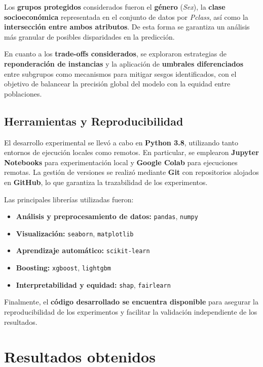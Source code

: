 \documentclass[sjournal]{IEEEtran}
\begin{document}
\vspace{0.2cm}
Los \textbf{grupos protegidos} considerados fueron el \textbf{género} (\textit{Sex}), la \textbf{clase socioeconómica} representada en el conjunto de datos por \textit{Pclass}, así como la \textbf{intersección entre ambos atributos}. De esta forma se garantiza un análisis más granular de posibles disparidades en la predicción.
\vspace{0.2cm}

En cuanto a los \textbf{trade-offs considerados}, se exploraron estrategias de \textbf{reponderación de instancias} y la aplicación de \textbf{umbrales diferenciados} entre subgrupos como mecanismos para mitigar sesgos identificados, con el objetivo de balancear la precisión global del modelo con la equidad entre poblaciones.


\subsection*{Herramientas y Reproducibilidad}
El desarrollo experimental se llevó a cabo en \textbf{Python 3.8}, utilizando tanto entornos de ejecución locales como remotos. En particular, se emplearon \textbf{Jupyter Notebooks} para experimentación local y \textbf{Google Colab} para ejecuciones remotas. La gestión de versiones se realizó mediante \textbf{Git} con repositorios alojados en \textbf{GitHub}, lo que garantiza la trazabilidad de los experimentos.

Las principales librerías utilizadas fueron:

\begin{itemize}
    \item \textbf{Análisis y preprocesamiento de datos:} \verb|pandas|, \verb|numpy|
    \item \textbf{Visualización:} \verb|seaborn|, \verb|matplotlib|
    \item \textbf{Aprendizaje automático:} \verb|scikit-learn|
    \item \textbf{Boosting:} \verb|xgboost|, \verb|lightgbm|
    \item \textbf{Interpretabilidad y equidad:} \verb|shap|, \verb|fairlearn|
\end{itemize}
Finalmente, el \textbf{código desarrollado se encuentra disponible} para asegurar la reproducibilidad de los experimentos y facilitar la validación independiente de los resultados. 



\section{Resultados obtenidos}
\end{document}
